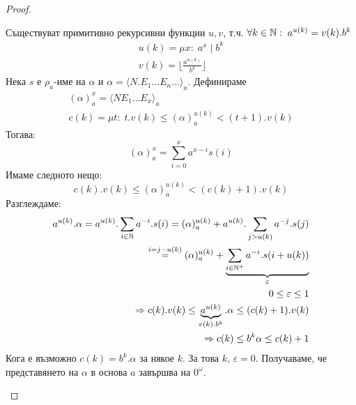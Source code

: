 \begin{proof}
\begin{itemize}
\begin{itemize}
            Съществуват примитивно рекурсивни функции $u, v$, т.ч. $\forall k \in {\mathbb{N}}:\; a^{u(k)} = v(k).b^{k}$
            \begin{equation}
                \begin{split}
                    u(k) = \mu x:\; a^x \mid b^k \\
                    v(k) = \lfloor \frac{a^{u(k)}}{b^k}\rfloor
                \end{split}
            \end{equation}
            Нека $s$ е $\rho_a$-име на $\alpha$ и $\alpha = \langle N.E_1 \dots E_n \dots\rangle_a$. Дефинираме
            \begin{equation}
                \begin{split}
                    (\alpha)_a^x = \langle N E_1 \dots E_x \rangle_a\\
                    c(k) = \mu t:\; t.v(k) \leq (\alpha)_a^{u(k)} < (t+1).v(k)
                \end{split}
            \end{equation}
            Тогава:
            \begin{equation}
                (\alpha)_a^x = \sum\limits_{i=0}^x a^{x-i} s(i)
            \end{equation}
            Имаме следното нещо:
            \begin{equation}
                c(k).v(k) \leq (\alpha)_a^{u(k)} < (c(k) + 1).v(k)
            \end{equation}
            Разглеждаме:
            \begin{equation}
                \begin{split}
                    a^{u(k)}.\alpha = a^{u(k)} . \sum\limits_{i\in{\mathbb{N}}} a^{-i}.s(i) = (\alpha)_a^{u(k)} + a^{u(k)} . \sum\limits_{j > u(k)} a^{-j}.s(j)\\
                    \overset{i=j-u(k)}{=} (\alpha)_a^{u(k)} + \underbrace{\sum\limits_{i \in {\mathbb{N}}^+} a^{-i}.s(i + u(k))}_{\varepsilon} \\
                    0 \leq \varepsilon \leq 1 \\
                    \Rightarrow c(k).v(k) \leq \underbrace{a^{u(k)}}_{v(k).b^k} . \alpha \leq (c(k) + 1).v(k) \\
                    \Rightarrow c(k) \leq b^k \alpha \leq c(k) + 1
                \end{split}
            \end{equation}
            Кога е възможно $c(k) = b^k.\alpha$ за някое $k$. За това $k$, $\varepsilon = 0$. Получаваме, че представянето на $\alpha$ в основа $a$ завършва на $0^{\omega}$.


\end{itemize}
\end{itemize}
\end{proof}
